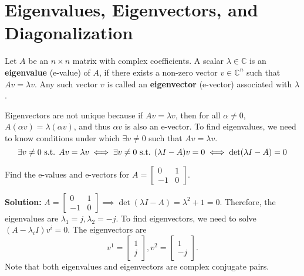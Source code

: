 \Qed

\section{Eigenvalues, Eigenvectors, and Diagonalization}

\begin{definition}
Let $A$ be an $n\times n$ matrix with complex coefficients. A scalar $\lambda \in \mathbb{C} $ is an \textbf{eigenvalue} (e-value) of $A$, if there exists a non-zero vector $v \in \mathbb{C}^{n}$ such that $Av=\lambda v$. Any such vector $v$ is called an \textbf{eigenvector} (e-vector) associated with $\lambda$. 
\end{definition}

Eigenvectors are not unique because if $Av=\lambda v$, then for all $\alpha \neq 0$, $A(\alpha v)=\lambda (\alpha v)$, and thus $\alpha v$ is also an e-vector. To find eigenvalues, we need to know conditions under which $\exists v\neq0$ such that $Av=\lambda v$.
    \begin{equation*}
     \exists v\neq 0 \text{ s.t. }   Av=\lambda v \iff  \exists v\neq 0 \text{ s.t. } (\lambda I-A)v=0\iff \textnormal{det}(\lambda I-A)=0
    \end{equation*}
    
    \vspace*{.2cm}

\begin{example} Find the e-values and e-vectors for $A=\left[\begin{array}{rr}
    0 & 1\\
    -1 & 0
    \end{array}\right]$.
    \end{example} 
    
\textbf{Solution:}  $A=\left[\begin{array}{rr}
    0 & 1\\
    -1 & 0
    \end{array}\right] \implies \det(\lambda I-A)=\lambda^2+1=0$. Therefore, the eigenvalues are $\lambda_{1}=j,\lambda_{2}=-j$. To find eigenvectors, we need to solve $(A-\lambda_{i}I)v^{i}=0$. The eigenvectors are 
    $$v^{1}=\left[\begin{array}{c}
        1\\
        j
    \end{array}\right],v^{2}=\left[\begin{array}{c}
        1\\
        -j
    \end{array}\right].$$
Note that both eigenvalues and eigenvectors are complex conjugate pairs. 
\Qed




